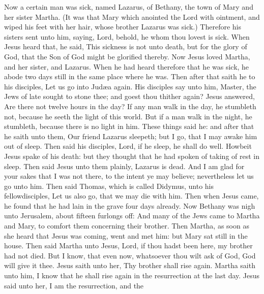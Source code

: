  Now a certain man was sick, named Lazarus, of Bethany,
the town of Mary and her sister Martha.  (It was that Mary
which anointed the Lord with ointment, and wiped his feet with her hair,
whose brother Lazarus was sick.)  Therefore his sisters
sent unto him, saying, Lord, behold, he whom thou lovest is sick.
 When Jesus heard that, he said, This sickness is not unto
death, but for the glory of God, that the Son of God might be glorified
thereby.  Now Jesus loved Martha, and her sister, and
Lazarus.  When he had heard therefore that he was sick, he
abode two days still in the same place where he was.  Then
after that saith he to his disciples, Let us go into Judæa again.
 His disciples say unto him, Master, the Jews of late
sought to stone thee; and goest thou thither again?  Jesus
answered, Are there not twelve hours in the day? If any man walk in the
day, he stumbleth not, because he seeth the light of this world.
 But if a man walk in the night, he stumbleth, because
there is no light in him.  These things said he: and
after that he saith unto them, Our friend Lazarus sleepeth; but I go,
that I may awake him out of sleep.  Then said his
disciples, Lord, if he sleep, he shall do well.  Howbeit
Jesus spake of his death: but they thought that he had spoken of taking
of rest in sleep.  Then said Jesus unto them plainly,
Lazarus is dead.  And I am glad for your sakes that I was
not there, to the intent ye may believe; nevertheless let us go unto
him.  Then said Thomas, which is called Didymus, unto his
fellowdisciples, Let us also go, that we may die with him.
 Then when Jesus came, he found that he had lain in the
grave four days already.  Now Bethany was nigh unto
Jerusalem, about fifteen furlongs off:  And many of the
Jews came to Martha and Mary, to comfort them concerning their brother.
 Then Martha, as soon as she heard that Jesus was coming,
went and met him: but Mary sat still in the house.  Then
said Martha unto Jesus, Lord, if thou hadst been here, my brother had
not died.  But I know, that even now, whatsoever thou
wilt ask of God, God will give it thee.  Jesus saith unto
her, Thy brother shall rise again.  Martha saith unto
him, I know that he shall rise again in the resurrection at the last
day.  Jesus said unto her, I am the resurrection, and the
